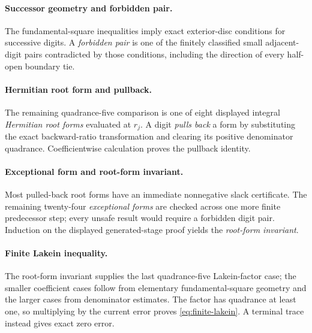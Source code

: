 \documentclass[11pt]{article}
\begin{document}
\paragraph{Successor geometry and forbidden pair.}
The fundamental-square inequalities imply exact exterior-disc conditions for
successive digits.  A \emph{forbidden pair} is one of the finitely classified
small adjacent-digit pairs contradicted by those conditions, including the
direction of every half-open boundary tie.

\paragraph{Hermitian root form and pullback.}
The remaining quadrance-five comparison is one of eight displayed integral
\emph{Hermitian root forms} evaluated at $r_j$.  A digit \emph{pulls back} a
form by substituting the exact backward-ratio transformation and clearing its
positive denominator quadrance.  Coefficientwise calculation proves the
pullback identity.

\paragraph{Exceptional form and root-form invariant.}
Most pulled-back root forms have an immediate nonnegative slack certificate.
The remaining twenty-four \emph{exceptional forms} are checked across one
more finite predecessor step; every unsafe result would require a forbidden
digit pair.  Induction on the displayed generated-stage proof yields the
\emph{root-form invariant}.

\paragraph{Finite Lakein inequality.}
The root-form invariant supplies the last quadrance-five Lakein-factor case;
the smaller coefficient cases follow from elementary fundamental-square
geometry and the larger cases from denominator estimates.  The factor has
quadrance at least one, so multiplying by the current error proves
\eqref{eq:finite-lakein}.  A terminal trace instead gives exact zero error.
\end{document}
